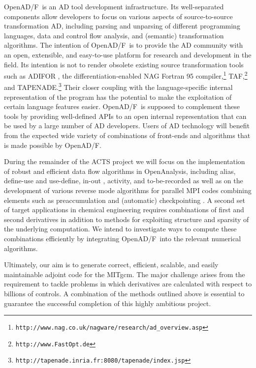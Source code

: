 \documentclass[11pt]{article}
\newcommand{\OpenADF}{OpenAD/F}
\newcommand{\OpenAnalysis}{OpenAnalysis}
\begin{document}
\OpenADF\ is an AD tool development infrastructure. Its well-separated components
allow developers to focus on various aspects of source-to-source 
transformation AD, including parsing and unparsing of different programming
languages, data and control flow analysis, and (semantic) transformation 
algorithms. The intention of \OpenADF\ is to provide the AD community with 
an open, extensible, and easy-to-use platform for research and development
in the field. Its intention is not to render obsolete existing source transformation
tools such as ADIFOR \cite{adiforWeb}, 
the differentiation-enabled NAG Fortran 95 
compiler,\footnote{{\tt http://www.nag.co.uk/nagware/research/ad\_overview.asp}} TAF,\footnote{{\tt http://www.FastOpt.de}} and TAPENADE.\footnote{{\tt http://tapenade.inria.fr:8080/tapenade/index.jsp}} 
Their closer coupling with the language-specific internal representation of 
the program has the potential to make the
exploitation of certain language features easier. \OpenADF\ is supposed to 
complement these tools by providing well-defined APIs to an open internal 
representation that can be used by a large number of AD developers.
Users of AD technology will benefit from the expected wide
variety of combinations of front-ends and algorithms that is made possible
by \OpenADF.

During the remainder of the ACTS project we will focus on the implementation
of robust and efficient data flow algorithms in \OpenAnalysis, including alias, 
define-use and use-define, in-out \cite{Muc97}, 
activity, and to-be-recorded \cite{HNP02} as well as on 
the development of various reverse mode algorithms for parallel MPI codes
combining elements such as preaccumulation and (automatic) checkpointing
\cite{Gri92}. 
A second set of target 
applications in chemical engineering \cite{FTB97} requires combinations of first and 
second derivatives in addition to methods for exploiting structure and sparsity
of the underlying computation. We intend to investigate ways to compute these
combinations efficiently by integrating \OpenADF\ into the relevant 
numerical algorithms.

Ultimately, our aim is to generate correct, efficient, scalable, and easily 
maintainable adjoint code for the MITgcm. The major challenge arises from the
requirement to tackle problems in which derivatives are calculated with respect 
to billions of controls. A combination of the methods outlined above is 
essential to guarantee the successful completion of this highly ambitious
project.

%




\end{document}
